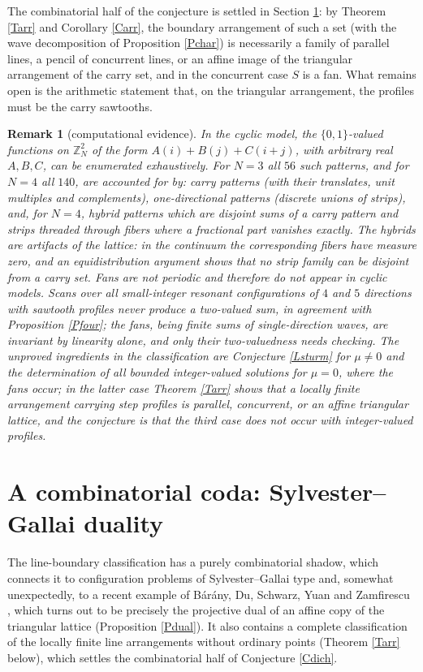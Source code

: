 \documentclass{article}
\newtheorem{remark}{Remark}
\def\Z{{\mathbb Z}}
\begin{document}
	The combinatorial half of the conjecture is settled in Section \ref{sec:SG}: by Theorem \ref{Tarr} and Corollary \ref{Carr}, the boundary arrangement of such a set (with the wave decomposition of Proposition \ref{Pchar}) is necessarily a family of parallel lines, a pencil of concurrent lines, or an affine image of the triangular arrangement of the carry set, and in the concurrent case $S$ is a fan. What remains open is the arithmetic statement that, on the triangular arrangement, the profiles must be the carry sawtooths.

	\begin{remark}[computational evidence]\label{Rcomp}
		In the cyclic model, the $\{0,1\}$-valued functions on $\Z_N^2$ of the form $A(i)+B(j)+C(i+j)$, with arbitrary real $A,B,C$, can be enumerated exhaustively. For $N=3$ all $56$ such patterns, and for $N=4$ all $140$, are accounted for by: carry patterns (with their translates, unit multiples and complements), one-directional patterns (discrete unions of strips), and, for $N=4$, hybrid patterns which are disjoint sums of a carry pattern and strips threaded through fibers where a fractional part vanishes \emph{exactly}. The hybrids are artifacts of the lattice: in the continuum the corresponding fibers have measure zero, and an equidistribution argument shows that no strip family can be disjoint from a carry set. Fans are not periodic and therefore do not appear in cyclic models. Scans over all small-integer resonant configurations of $4$ and $5$ directions with sawtooth profiles never produce a two-valued sum, in agreement with Proposition \ref{Pfour}; the fans, being finite sums of single-direction waves, are invariant by linearity alone, and only their two-valuedness needs checking. The unproved ingredients in the classification are Conjecture \ref{Lsturm} for $\mu\neq0$ and the determination of all bounded integer-valued solutions for $\mu=0$, where the fans occur; in the latter case Theorem \ref{Tarr} shows that a locally finite arrangement carrying step profiles is parallel, concurrent, or an affine triangular lattice, and the conjecture is that the third case does not occur with integer-valued profiles.
	\end{remark}

	\section{A combinatorial coda: Sylvester--Gallai duality}\label{sec:SG}

	The line-boundary classification has a purely combinatorial shadow, which connects it to configuration problems of Sylvester--Gallai type and, somewhat unexpectedly, to a recent example of B\'ar\'any, Du, Schwarz, Yuan and Zamfirescu \cite{BDSYZ}, which turns out to be precisely the projective dual of an affine copy of the triangular lattice (Proposition \ref{Pdual}). It also contains a complete classification of the locally finite line arrangements without ordinary points (Theorem \ref{Tarr} below), which settles the combinatorial half of Conjecture \ref{Cdich}.
\end{document}
